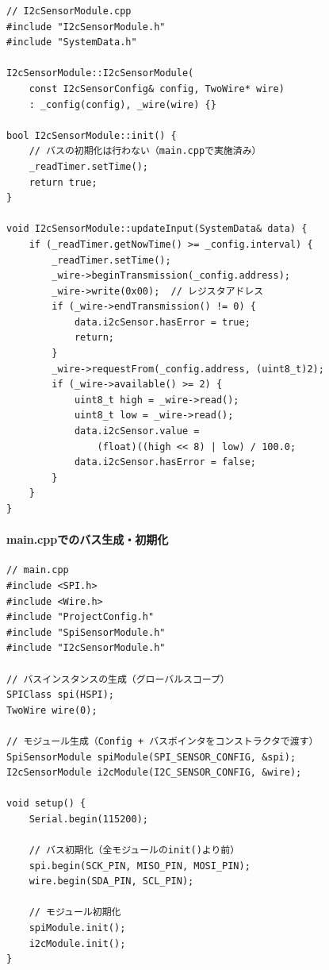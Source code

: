 \begin{lstlisting}[style=cppstyle, caption={I2Cバスを使用するモジュールの実装}]
// I2cSensorModule.cpp
#include "I2cSensorModule.h"
#include "SystemData.h"

I2cSensorModule::I2cSensorModule(
    const I2cSensorConfig& config, TwoWire* wire)
    : _config(config), _wire(wire) {}

bool I2cSensorModule::init() {
    // バスの初期化は行わない（main.cppで実施済み）
    _readTimer.setTime();
    return true;
}

void I2cSensorModule::updateInput(SystemData& data) {
    if (_readTimer.getNowTime() >= _config.interval) {
        _readTimer.setTime();
        _wire->beginTransmission(_config.address);
        _wire->write(0x00);  // レジスタアドレス
        if (_wire->endTransmission() != 0) {
            data.i2cSensor.hasError = true;
            return;
        }
        _wire->requestFrom(_config.address, (uint8_t)2);
        if (_wire->available() >= 2) {
            uint8_t high = _wire->read();
            uint8_t low = _wire->read();
            data.i2cSensor.value =
                (float)((high << 8) | low) / 100.0;
            data.i2cSensor.hasError = false;
        }
    }
}
\end{lstlisting}

\paragraph{main.cppでのバス生成・初期化}

\begin{lstlisting}[style=cppstyle, caption={main.cppでの通信バス生成と初期化}]
// main.cpp
#include <SPI.h>
#include <Wire.h>
#include "ProjectConfig.h"
#include "SpiSensorModule.h"
#include "I2cSensorModule.h"

// バスインスタンスの生成（グローバルスコープ）
SPIClass spi(HSPI);
TwoWire wire(0);

// モジュール生成（Config + バスポインタをコンストラクタで渡す）
SpiSensorModule spiModule(SPI_SENSOR_CONFIG, &spi);
I2cSensorModule i2cModule(I2C_SENSOR_CONFIG, &wire);

void setup() {
    Serial.begin(115200);

    // バス初期化（全モジュールのinit()より前）
    spi.begin(SCK_PIN, MISO_PIN, MOSI_PIN);
    wire.begin(SDA_PIN, SCL_PIN);

    // モジュール初期化
    spiModule.init();
    i2cModule.init();
}
\end{lstlisting}

